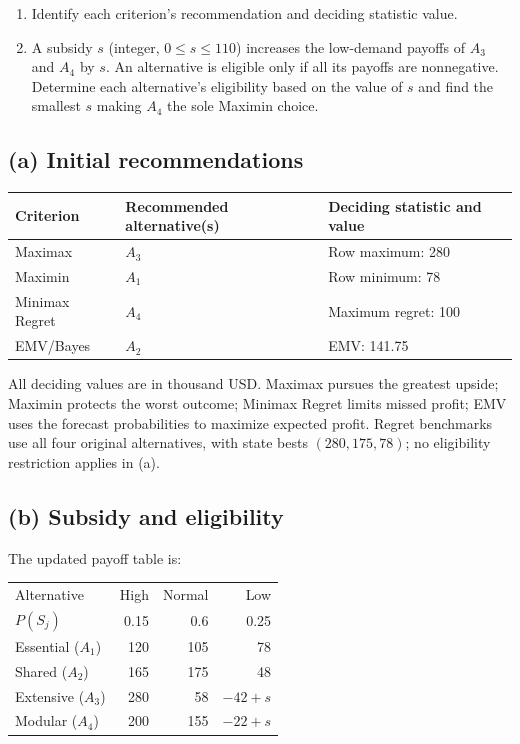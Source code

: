 \begin{enumerate}[label=\textbf{(\alph*)},leftmargin=*]
	\item Identify each criterion's recommendation and deciding statistic value. 

	\item A subsidy $s$ (integer, $0\leq s\leq110$) increases the low-demand payoffs of $A_3$ and $A_4$ by $s$. An alternative is eligible only if all its payoffs are nonnegative. Determine each alternative's eligibility based on the value of $s$ and find the smallest $s$ making $A_4$ the sole Maximin choice.
\end{enumerate}
\label{sol:q1a}
\subsection*{(a) Initial recommendations }
\begin{center}
\begin{tabular}{lll}\toprule
Criterion & Recommended alternative(s) & Deciding statistic and value\\ \midrule
		Maximax & $A_3$ & Row maximum: 280\\
		Maximin & $A_1$ & Row minimum: 78\\
		Minimax Regret & $A_4$ & Maximum regret: 100\\
		EMV/Bayes & $A_2$ & EMV: 141.75\\
		\bottomrule\end{tabular}
\end{center}
All deciding values are in thousand USD. Maximax pursues the greatest upside; Maximin protects the worst outcome; Minimax Regret limits missed profit; EMV uses the forecast probabilities to maximize expected profit. Regret benchmarks use all four original alternatives, with state bests $(280,175,78)$; no eligibility restriction applies in (a).
\secInicio[sec:q1]


\label{sol:q1b}
\subsection*{(b) Subsidy and eligibility }

The updated payoff table is:

\begin{center}\small\setlength{\tabcolsep}{4pt}
	\begin{tabular}{lrrr}\toprule
		Alternative & High & Normal & Low\\
		$P(S_j)$ & 0.15 & 0.6 & 0.25\\ \midrule
				Essential ($A_1$) & 120 & 105 & 78\\
		Shared ($A_2$) & 165 & 175 & 48\\
		Extensive ($A_3$) & 280 & 58 & $-42+s$\\
		Modular ($A_4$) & 200 & 155 & $-22+s$\\
		\bottomrule
	\end{tabular}
\end{center}

